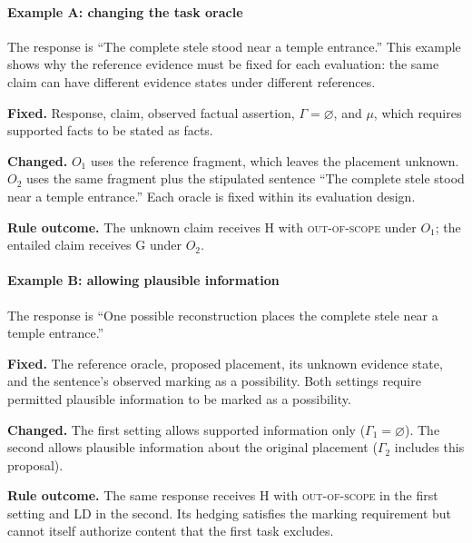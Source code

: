 \documentclass{clv2025}
\newcommand{\LD}{\textsc{LD}}
\newcommand{\Hall}{\textsc{H}}
\newcommand{\Grd}{\textsc{G}}
\begin{document}
\paragraph{Example A: changing the task oracle}
The response is ``The complete stele stood near a temple entrance.''
This example shows why the reference evidence must be fixed for each
evaluation: the same claim can have different evidence states under
different references.
\par\textbf{Fixed.} Response, claim, observed factual assertion,
$\Gamma=\varnothing$, and $\mu$, which requires supported facts to be stated as facts.
\par\textbf{Changed.} $O_1$ uses the reference fragment, which leaves the
placement unknown. $O_2$ uses the same fragment plus the stipulated sentence
``The complete stele stood near a temple entrance.'' Each oracle is fixed
within its evaluation design.
\par\textbf{Rule outcome.} The unknown claim receives \Hall{} with
\textsc{out-of-scope} under $O_1$; the entailed claim receives \Grd{} under
$O_2$.

\paragraph{Example B: allowing plausible information}
The response is ``One possible reconstruction places the complete stele
near a temple entrance.''
\par\textbf{Fixed.} The reference oracle, proposed placement, its unknown
evidence state, and the sentence's observed marking as a possibility.
Both settings require permitted plausible information to be marked as a possibility.
\par\textbf{Changed.} The first setting allows supported information only
($\Gamma_1=\varnothing$). The second allows plausible information about the
original placement ($\Gamma_2$ includes this proposal).
\par\textbf{Rule outcome.} The same response receives \Hall{} with
\textsc{out-of-scope} in the first setting and \LD{} in the second.
Its hedging satisfies the marking requirement but cannot itself authorize
content that the first task excludes.
\end{document}
